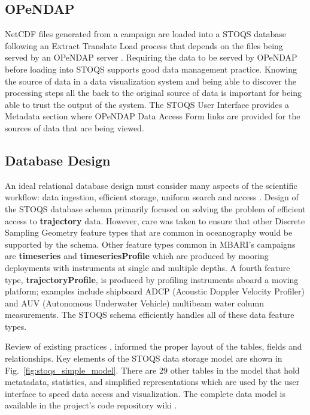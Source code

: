 \documentclass[conference]{IEEEtran}
\begin{document}
\subsection{OPeNDAP}

NetCDF files generated from a campaign are loaded into a STOQS database following an Extract Translate
Load process that depends on the files being served by an OPeNDAP server \cite{Cornillon03opendap:accessing}.
Requiring the data to be served by OPeNDAP before loading into STOQS
supports good data management practice. Knowing the source of data in a data visualization 
system and being able to discover the processing steps all the back to the original source
of data is important for being able to trust the output of the system. The STOQS User Interface
provides a Metadata section where OPeNDAP Data Access Form links are provided for the sources 
of data that are being viewed.

\subsection{Database Design}
An ideal relational database design must consider many aspects of the scientific 
workflow: data ingestion, efficient storage, uniform search and access 
\cite{Bechini:2013:MSS:2425433.2425647}. Design of the STOQS database schema primarily 
focused on solving the problem of efficient access to \textbf{trajectory} data. 
However, care was taken to ensure that other Discrete Sampling Geometry feature types 
\cite{DSG} that are common in oceanography would be supported by the schema.  Other 
feature types common in MBARI's campaigns are \textbf{timeseries} and \textbf{timeseriesProfile} 
which are produced by mooring deployments with instruments at single and multiple depths. 
A fourth feature type, \textbf{trajectoryProfile}, is produced by profiling instruments 
aboard a moving platform; examples include shipboard ADCP (Acoustic Doppler Velocity Profiler)
and AUV (Autonomous Underwater Vehicle) multibeam water column 
measurements. The STOQS schema efficiently handles all of these data feature types.

Review of existing practices \cite{Wright}, \cite{MODB} informed the proper layout 
of the tables, fields and relationships.  Key elements of the STOQS data storage model 
are shown in Fig.~\ref{fig:stoqs_simple_model}. There are 29 other tables in the model 
that hold metatadata, statistics, and simplified representations which are used by 
the user interface to speed data access and visualization. The complete data model 
is available in the project's code repository wiki \cite{stoqs_github}. 
\end{document}
